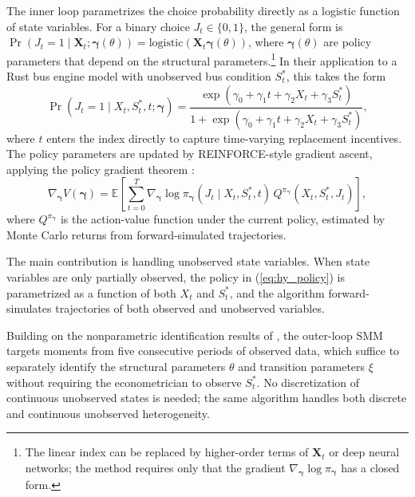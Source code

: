 The inner loop parametrizes the choice probability directly as a logistic function of state variables. For a binary choice $J_t \in \{0, 1\}$, the general form is $\Pr(J_t = 1 \mid \boldsymbol{X}_t; \boldsymbol{\gamma}(\theta)) = \text{logistic}(\boldsymbol{X}_t \boldsymbol{\gamma}(\theta))$, where $\boldsymbol{\gamma}(\theta)$ are policy parameters that depend on the structural parameters.\footnote{The linear index can be replaced by higher-order terms of $\boldsymbol{X}_t$ or deep neural networks; the method requires only that the gradient $\nabla_{\boldsymbol{\gamma}} \log \pi_{\boldsymbol{\gamma}}$ has a closed form.} In their application to a Rust bus engine model with unobserved bus condition $S_t^*$, this takes the form
\begin{equation}
\Pr(J_t = 1 \mid X_t, S_t^*, t; \boldsymbol{\gamma}) = \frac{\exp(\gamma_0 + \gamma_1 t + \gamma_2 X_t + \gamma_3 S_t^*)}{1 + \exp(\gamma_0 + \gamma_1 t + \gamma_2 X_t + \gamma_3 S_t^*)}, \label{eq:hy_policy}
\end{equation}
where $t$ enters the index directly to capture time-varying replacement incentives. The policy parameters are updated by REINFORCE-style gradient ascent, applying the policy gradient theorem \citep{Sutton1999}:
\begin{equation}
\nabla_{\boldsymbol{\gamma}} V(\boldsymbol{\gamma}) = \mathbb{E}\left[\sum_{t=0}^{T} \nabla_{\boldsymbol{\gamma}} \log \pi_{\boldsymbol{\gamma}}(J_t \mid X_t, S_t^*, t) \, Q^{\pi_{\boldsymbol{\gamma}}}(X_t, S_t^*, J_t)\right], \label{eq:hy_pg}
\end{equation}
where $Q^{\pi_{\boldsymbol{\gamma}}}$ is the action-value function under the current policy, estimated by Monte Carlo returns from forward-simulated trajectories.

The main contribution is handling unobserved state variables. When state variables are only partially observed, the policy in (\ref{eq:hy_policy}) is parametrized as a function of both $X_t$ and $S_t^*$, and the algorithm forward-simulates trajectories of both observed and unobserved variables.

Building on the nonparametric identification results of \citet{HuShum2012}, the outer-loop SMM targets moments from five consecutive periods of observed data, which suffice to separately identify the structural parameters $\theta$ and transition parameters $\xi$ without requiring the econometrician to observe $S_t^*$. No discretization of continuous unobserved states is needed; the same algorithm handles both discrete and continuous unobserved heterogeneity.

